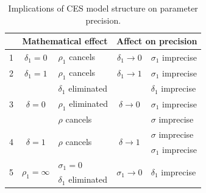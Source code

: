 \documentclass[preprint,authoryear,12pt]{elsarticle}\usepackage[]{graphicx}\usepackage[]{color}
\begin{document}
\begin{table} \caption{Implications of CES model structure 
                        on parameter precision.} \label{tab:ces_sensitivity_table} 
  \begin{center}
    \begin{tabular}{c c l c l} 
      \toprule
       & \multicolumn{2}{c}{Mathematical effect} & \multicolumn{2}{c}{Affect on precision} \\
      \midrule
      1 & $\delta_1 = 0$ & $\rho_1$ cancels & $\delta_1 \rightarrow 0$ & $\sigma_1$ imprecise \\ [2 mm]
      2 & $\delta_1 = 1$ & $\rho_1$ cancels & $\delta_1 \rightarrow 1$ & $\sigma_1$ imprecise \\ [2 mm]
      \multirow{3}{*}{3} 
        & \multirow{3}{*}{$\delta = 0$}   
                         & $\delta_1$ eliminated
                                            & \multirow{3}{*}{$\delta \rightarrow 0$}
                                                                       & $\delta_1$ imprecise \\ [-1 mm]
%
        &                & $\rho_1$ eliminated &                       & $\sigma_1$ imprecise \\ [-1 mm]
%
        &                & $\rho$\; cancels   
                                            &                          & $\sigma$\; imprecise \\ [2 mm]
      \multirow{2}{*}{4}
        & \multirow{2}{*}{$\delta = 1$}
                         & \multirow{2}{*}{$\rho$\; cancels}
                                            & \multirow{2}{*}{$\delta \rightarrow 1$}
                                                                       & $\sigma$\; imprecise   \\ [-1 mm] 
%
        &                &                  &                          & $\sigma_1$ imprecise    \\ [2 mm]
      \multirow{2}{*}{5}
        & \multirow{2}{*}{$\rho_1 = \infty$}
                         & $\sigma_1 = 0$   & \multirow{2}{*}{$\sigma_1 \rightarrow 0$}
                                                                       & \multirow{2}{*}{$\delta_1$ imprecise} 
                                                                                    \\ [-1 mm]
%
        &                & $\delta_1$ eliminated
                                            &                          &                      \\ [2 mm]

\end{tabular}
\end{center}
\end{table}
\end{document}
